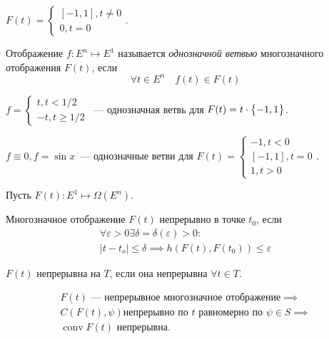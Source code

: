 \begin{exmp}
    $F(t) = \begin{cases}
        [-1, 1], t \neq 0 \\
        0, t = 0
    \end{cases}$.
\end{exmp}

\begin{defn}
    Отображение $f\colon E^n \mapsto E^1$ называется \textit{однозначной ветвью}
    многозначного отображения $F(t)$, если
    \begin{equation*}
        \forall t \in E^n \quad f(t) \in F(t)
    \end{equation*}
\end{defn}

\begin{exmp}
    $f = \begin{cases}
        t, t < 1/2 \\
        -t, t \geqslant 1/2
    \end{cases}$~--- однозначная ветвь для $F(t) = t \cdot \bigl\{ -1, 1 \bigr\}$.
\end{exmp}

\begin{exmp}
    $f \equiv 0, f = \sin x$~--- однозначные ветви для $F(t) = \begin{cases}
        -1, t < 0 \\
        [-1, 1], t = 0 \\
        1, t > 0
    \end{cases}$.
\end{exmp}

Пусть $F(t)\colon E^1 \mapsto \Omega(E^n)$.
\begin{defn}
    Многозначное отображение $F(t)$ непрерывно в точке $t_0$, если
    \begin{align*}
        \forall \varepsilon > 0 \exists \delta = \delta(\varepsilon) > 0\colon \\
        |t - t_o| \leqslant \delta \implies h(F(t), F(t_0)) \leqslant \varepsilon
    \end{align*}
\end{defn}

\begin{defn}
    $F(t)$ непрерывна на $T$, если она непрерывна $\forall t \in T$.
\end{defn}

\begin{thm*}
    \begin{multline*}
        F(t) \text{~--- непрерывное многозначное отображение} \implies \\
        C(F(t), \psi) \text{непрерывно по } t \text{ равномерно по } \psi \in S \implies \\
        \operatorname{conv} F(t) \text{ непрерывна.}
    \end{multline*}
\end{thm*}

